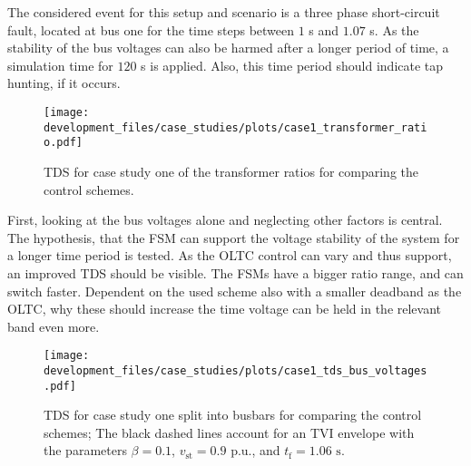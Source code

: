 The considered event for this setup and scenario is a three phase short-circuit fault, located at bus one for the time steps between $1$ s and $1.07$ s.
As the stability of the bus voltages can also be harmed after a longer period of time, a simulation time for $120$ s is applied.
Also, this time period should indicate tap hunting, if it occurs.

\begin{figure}[htbp!]
    \centering
    \texttt{[image: development\_files/case\_studies/plots/case1\_transformer\_ratio.pdf]}
    \caption[\acs{TDS} for case study one of the transformer ratios for comparing the control schemes]{\acs{TDS} for case study one of the transformer ratios for comparing the control schemes.}
    \label{fig:case1-trans-ratio}
\end{figure}

First, looking at the bus voltages alone and neglecting other factors is central.
The hypothesis, that the \acs{FSM} can support the voltage stability of the system for a longer time period is tested.
As the \acs{OLTC} control can vary and thus support, an improved \acs{TDS} should be visible. 
The \acsp{FSM} have a bigger ratio range, and can switch faster.
Dependent on the used scheme also with a smaller deadband as the \acs{OLTC}, why these should increase the time voltage can be held in the relevant band even more.  

\begin{figure}[htbp!]
    \centering
    \texttt{[image: development\_files/case\_studies/plots/case1\_tds\_bus\_voltages.pdf]}
    \caption[\acs{TDS} for case study one split into busbars for comparing the control schemes]{\acs{TDS} for case study one split into busbars for comparing the control schemes; The black dashed lines account for an \acs{TVI} envelope with the parameters $\beta=0.1$,  $v_\mathrm{st}=0.9\text{ p.u.}$, and $t_\mathrm{f}=1.06\text{ s}$.}
    \label{fig:case1-voltages}
\end{figure}

